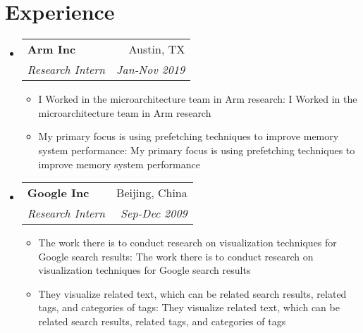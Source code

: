 \documentclass[letterpaper,10pt]{article}
\makeatletter
\def \ifempty#1{\def\temp{#1} \ifx\temp\empty }
\newcommand{\resumeItem}[2]{
  \item\small{
  	\ifempty{#1}#2\else\textbf{#1}{: #2 \vspace{-2pt}}\fi
  }
}
\newcommand{\resumeSubheading}[4]{
  \vspace{-1pt}\item
    \begin{tabular*}{0.97\textwidth}{l@{\extracolsep{\fill}}r}
      \textbf{#1} & #2 \\
      \textit{\small#3} & \textit{\small #4} \\
    \end{tabular*}\vspace{-5pt}
}
\newcommand{\resumeSubHeadingListStart}{\begin{itemize}[leftmargin=*]}
\newcommand{\resumeSubHeadingListEnd}{\end{itemize}}
\newcommand{\resumeItemListStart}{\begin{itemize}}
\newcommand{\resumeItemListEnd}{\end{itemize}\vspace{-5pt}}
\makeatother
\begin{document}
\section{Experience}
  \resumeSubHeadingListStart
    \resumeSubheading
      {Arm Inc}{Austin, TX}
      {Research Intern}{Jan-Nov 2019}
      \resumeItemListStart
      	\resumeItem{}
          {I Worked in the microarchitecture team in Arm research}
        \resumeItem{}
          {My primary
focus is using prefetching techniques to improve memory system performance}
      \resumeItemListEnd
        \resumeSubheading
      {Google Inc}{Beijing, China}
      {Research Intern}{Sep-Dec 2009}
      \resumeItemListStart
      	\resumeItem{}
          {The work there is to conduct research on visualization
techniques for Google search results}
        \resumeItem{}
        {They visualize related text, which can be related
    search results, related tags, and categories of tags}
      \resumeItemListEnd
  \resumeSubHeadingListEnd
\end{document}
